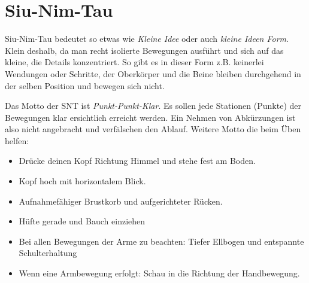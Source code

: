 \section{Siu-Nim-Tau}

Siu-Nim-Tau bedeutet so etwas wie \textit{Kleine Idee} oder auch \textit{kleine Ideen Form}. Klein deshalb, da man recht isolierte Bewegungen ausf\"uhrt und sich auf das kleine, die Details konzentriert. So gibt es in dieser Form z.B. keinerlei Wendungen oder Schritte, der Oberk\"orper und die Beine bleiben durchgehend in der selben Position und bewegen sich nicht.


Das Motto der SNT ist \textit{Punkt-Punkt-Klar}. Es sollen jede Stationen (Punkte) der Bewegungen klar ersichtlich erreicht werden. Ein Nehmen von Abk\"urzungen ist also nicht angebracht und verf\"alschen den Ablauf. Weitere Motto die beim \"Uben helfen:

\begin{itemize}
	\item Dr\"ucke deinen Kopf Richtung Himmel und stehe fest am Boden.
	\item Kopf hoch mit horizontalem Blick.
	\item Aufnahmef\"ahiger Brustkorb und aufgerichteter R\"ucken.
	\item H\"ufte gerade und Bauch einziehen
	\item Bei allen Bewegungen der Arme zu beachten: Tiefer Ellbogen und entspannte Schulterhaltung
	\item Wenn eine Armbewegung erfolgt: Schau in die Richtung der Handbewegung.
\end{itemize}

 



